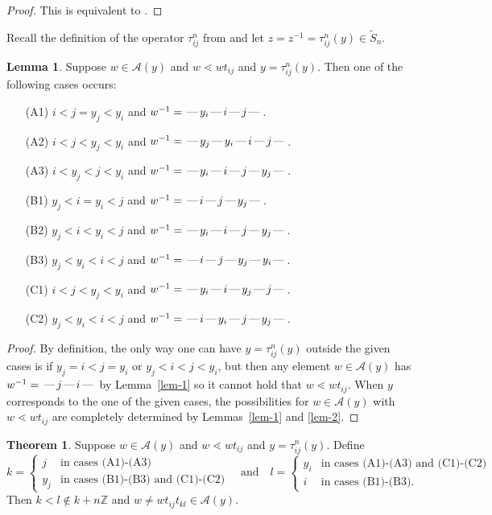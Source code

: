 \documentclass[10pt]{article}
\theoremstyle{definition}
\newtheorem*{theorem}{Theorem}
\theoremstyle{definition}
\newtheorem{lemma}{Lemma}
\def\dash{\text{\hspace{0.5mm}---\hspace{0.5mm}}}
\def\ZZ{\mathbb{Z}}
\def\cA{\mathcal{A}}
\begin{document}
\begin{proof}
This is equivalent to \cite[Proposition 8.3.6]{BB}.
\end{proof}

Recall the definition of the operator $\tau^n_{ij}$ from \cite[\S8]{M} and
let $z = z^{-1} = \tau^n_{ij}(y) \in \tilde S_n$.

\begin{lemma}\label{lem-3}
Suppose $w \in \cA(y)$ and $w \lessdot wt_{ij}$ and $y = \tau^n_{ij}(y)$.
Then one of the following cases occurs:
\begin{enumerate}
\item[(A1)] $i < j = y_j < y_i$ and $w^{-1} = \dash y_i \dash i \dash j \dash$.
\item[(A2)] $i < j < y_j < y_i$ and $w^{-1} = \dash y_j \dash y_i \dash i \dash j \dash$.
\item[(A3)] $i < y_j < j < y_i$ and $w^{-1} = \dash y_i \dash i  \dash j  \dash y_j \dash$.
\item[(B1)] $y_j < i = y_i < j$ and $w^{-1} =  \dash i \dash j \dash y_j \dash$.
\item[(B2)] $y_j < i < y_i < j$ and $w^{-1} = \dash y_i \dash i  \dash j  \dash y_j \dash$.
\item[(B3)] $y_j < y_i < i < j$ and $w^{-1} = \dash  i \dash j \dash y_j \dash y_i \dash$.
\item[(C1)] $i < j < y_j < y_i$ and $w^{-1} = \dash y_i \dash i \dash y_j \dash j \dash$.
\item[(C2)] $y_j < y_i < i < j$ and $w^{-1} = \dash  i \dash y_i  \dash j  \dash y_j  \dash$.
\end{enumerate}
\end{lemma}

\begin{proof}
By definition,
the only way one can have $y = \tau^n_{ij}(y)$
outside the given cases is if
$y_j = i < j = y_i$ or $y_j < i < j < y_i$, but then
any element $w \in \cA(y)$ has
$w^{-1} = \dash j \dash i \dash$ by Lemma~\ref{lem-1}
so it cannot hold that $w\lessdot wt_{ij}$.
When $y$ corresponds to the one of the given cases,
the possibilities for $w \in \cA(y)$ with $w\lessdot wt_{ij}$
are completely determined by Lemmas~\ref{lem-1} and \ref{lem-2}.
\end{proof}

\begin{theorem}
Suppose $w \in \cA(y)$ and $w \lessdot wt_{ij}$ and $y = \tau^n_{ij}(y)$.
Define
\[
k = \begin{cases}
j &\text{in cases (A1)-(A3)} \\
y_j &\text{in cases (B1)-(B3) and (C1)-(C2)}
\end{cases}
\quad\text{and}\quad
l =  \begin{cases}
y_i &\text{in cases (A1)-(A3) and (C1)-(C2)} \\
i &\text{in cases (B1)-(B3).}
\end{cases}
\]
Then $k<l \notin k + n\ZZ$ and $w \neq w t_{ij} t_{kl} \in \cA(y)$.
\end{theorem}
\end{document}
